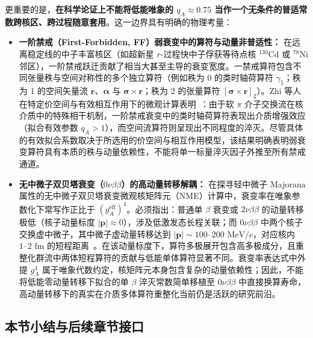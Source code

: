 更重要的是，\textbf{在科学论证上不能将低能唯象的 $q_A \approx 0.75$ 当作一个无条件的普适常数跨核区、跨过程随意套用}。这一边界具有明确的物理考量：
\begin{itemize}
\item \textbf{一阶禁戒（First-Forbidden, FF）弱衰变中的算符与动量非普适性：}
在远离稳定线的中子丰富核区（如超新星 $r$-过程快中子俘获等待点核 $^{130}\mathrm{Cd}$ 或 $^{78}\mathrm{Ni}$ 邻区），一阶禁戒跃迁贡献了相当大甚至主导的衰变宽度。一禁戒算符包含不同张量秩与空间对称性的多个独立算符（例如秩为 0 的类时轴荷算符 $\gamma_5$；秩为 1 的空间矢量流 $\mathbf{r}$、$\boldsymbol{\alpha}$ 与 $\boldsymbol{\sigma}\times\mathbf{r}$；秩为 2 的张量算符 $[\boldsymbol{\sigma} \times \mathbf{r}]_2$）。Zhi 等人在特定价空间与有效相互作用下的微观计算表明~\cite{doctoral-r1-g34-zhi-2013-prc-shell-model-half-lives}：由于软 $\pi$ 介子交换流在核介质中的特殊相干机制，一阶禁戒衰变中的类时轴荷算符表现出介质增强效应（拟合有效参数 $q_A > 1$），而空间流算符则呈现出不同程度的淬灭。尽管具体的有效拟合系数取决于所选用的价空间与相互作用模型，该结果明确表明弱衰变算符具有本质的秩与动量依赖性，不能将单一标量淬灭因子外推至所有禁戒通道。
\item \textbf{无中微子双贝塔衰变（$0\nu\beta\beta$）的高动量转移解耦：}
在探寻轻中微子 Majorana 属性的无中微子双贝塔衰变微观核矩阵元（NME）计算中，衰变率在唯象参数化下常写作正比于 $(g_A^{\mathrm{eff}})^4$。必须指出：普通单 $\beta$ 衰变或 $2\nu\beta\beta$ 的动量转移极低（核子动量标度 $|\mathbf{p}| \approx 0$），涉及低激发态长程关联；而 $0\nu\beta\beta$ 中两个核子交换虚中微子，其中微子虚动量转移达到 $|\mathbf{p}| \sim 100\text{--}200\text{ MeV}/c$，对应核内 $1\text{--}2\text{ fm}$ 的短程距离~\cite{engel-menendez-2017-double-beta-matrix-elements-review}。在该动量标度下，算符多极展开包含高多极成分，且重整化群流中两体短程算符的贡献与低能单体算符显著不同。衰变率表达式中外提 $g_A^4$ 属于唯象代数约定，核矩阵元本身包含复杂的动量依赖性；因此，不能将低能零动量转移下拟合的单 $\beta$ 淬灭常数简单移植至 $0\nu\beta\beta$ 中直接换算寿命，高动量转移下的真实在介质多体算符重整化当前仍是活跃的研究前沿。
\end{itemize}

\subsection{本节小结与后续章节接口}\label{sec:2-7-6}


